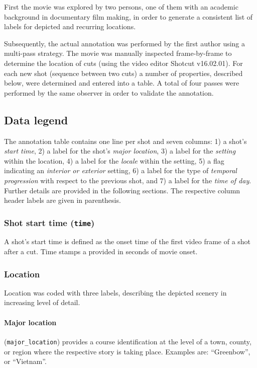 \documentclass[10pt,a4paper]{article}
\begin{document}
\begin{multicols}{2}
First the movie was explored by two persons, one of them with an academic
background in documentary film making, in order to generate a consistent list of
labels for depicted and recurring locations.

Subsequently, the actual annotation was performed by the first author using a
multi-pass strategy. The movie was manually inspected frame-by-frame to
determine the location of cuts (using the video editor Shotcut v16.02.01).
For each new shot (sequence between two cuts) a number of properties,
described below, were determined and entered into a table. A total of four
passes were performed by the same observer in order to validate the annotation.

\subsection*{Data legend}

The annotation table contains one line per shot and seven columns: 1) a shot's
\textit{start time}, 2) a label for the shot's \textit{major location}, 3) a
label for the \textit{setting} within the location, 4) a label for the
\textit{locale} within the setting, 5) a flag indicating an \textit{interior or
exterior} setting, 6) a label for the type of \textit{temporal progression}
with respect to the previous shot, and 7) a label for the \textit{time of day}.
Further details are provided in the following sections. The respective column
header labels are given in parenthesis.


\subsubsection*{Shot start time (\texttt{time})}

A shot's start time is defined as the onset time of the first video frame of a
shot after a cut. Time stamps a provided in seconds of movie onset. 

\subsubsection*{Location}

Location was coded with three labels, describing the depicted scenery
in increasing level of detail.

\paragraph{Major location} (\texttt{major\_location}) provides a course
identification at the level of a town, county, or region where the respective
story is taking place. Examples are: ``Greenbow'', or ``Vietnam''.


\end{multicols}
\end{document}
